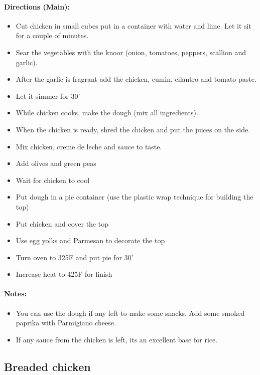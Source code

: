 \documentclass{article}
\begin{document}
\paragraph{Directions (Main):}
\begin{itemize}
    \item Cut chicken in small cubes put in a container with water and lime. Let it sit for a couple of minutes.
    \item Sear the vegetables with the knoor (onion, tomatoes, peppers, scallion and garlic).
    \item After the garlic is fragrant add the chicken, cumin, cilantro and tomato paste.
    \item Let it simmer for 30'
    \item While chicken cooks, make the dough (mix all ingredients).
    \item When the chicken is ready, shred the chicken and put the juices on the side.
    \item Mix chicken, creme de leche and sauce to taste.
    \item Add olives and green peas
    \item Wait for chicken to cool
    \item Put dough in a pie container (use the plastic wrap technique for building the top)
    \item Put chicken and cover the top
    \item Use egg yolks and Parmesan to decorate the top
    \item Turn oven to 325F and put pie for 30'
    \item Increase heat to 425F for finish
\end{itemize} 

\paragraph{Notes:}
\begin{itemize}
    \item You can use the dough if any left to make some snacks. Add some smoked paprika with Parmigiano cheese.
    \item If any sauce from the chicken is left, its an excellent base for rice.
\end{itemize}

\subsection{Breaded chicken}
\end{document}
